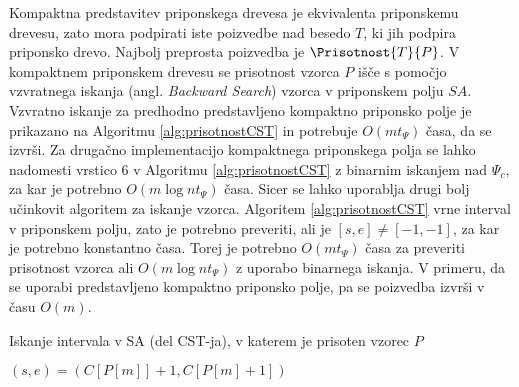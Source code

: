 Kompaktna predstavitev priponskega drevesa je ekvivalenta priponskemu drevesu, zato mora podpirati iste poizvedbe nad besedo $T$, ki jih podpira priponsko drevo. Najbolj preprosta poizvedba je $\Prisotnost{T}{P}$. V kompaktnem priponskem drevesu se prisotnost vzorca $P$ išče s pomočjo vzvratnega iskanja (angl. \textit{Backward Search}) vzorca v priponskem polju $SA$. Vzvratno iskanje za predhodno predstavljeno kompaktno priponsko polje je prikazano na Algoritmu \ref{alg:prisotnostCST} in potrebuje $O(mt_\Psi)$ časa, da se izvrši. Za drugačno implementacijo kompaktnega priponskega polja se lahko nadomesti vrstico 6 v Algoritmu \ref{alg:prisotnostCST} z binarnim iskanjem nad $\Psi_c$, za kar je potrebno $O(m\log{n}t_\Psi)$ časa. Sicer se lahko uporablja drugi bolj učinkovit algoritem za iskanje vzorca. Algoritem \ref{alg:prisotnostCST} vrne interval v priponskem polju, zato je potrebno preveriti, ali je $[s,e]\ne[-1,-1]$, za kar je potrebno konstantno časa. Torej je potrebno $O(mt_\Psi)$ časa za preveriti prisotnost vzorca ali $O(m\log{n}t_\Psi)$ z uporabo binarnega iskanja. V primeru, da se uporabi predstavljeno kompaktno priponsko polje, pa se poizvedba izvrši v času $O(m)$. 

\begin{algorithm}[tb]

\caption{Iskanje intervala v SA (del CST-ja), v katerem je prisoten vzorec $P$ \cite{Navarro2016}}\label{alg:prisotnostCST}    
{
    {$(s,e)=(C[P[m]]+1,C[P[m]+1])$}
    


    {\KwRet{$[s,e]$}}
}

\end{algorithm}

